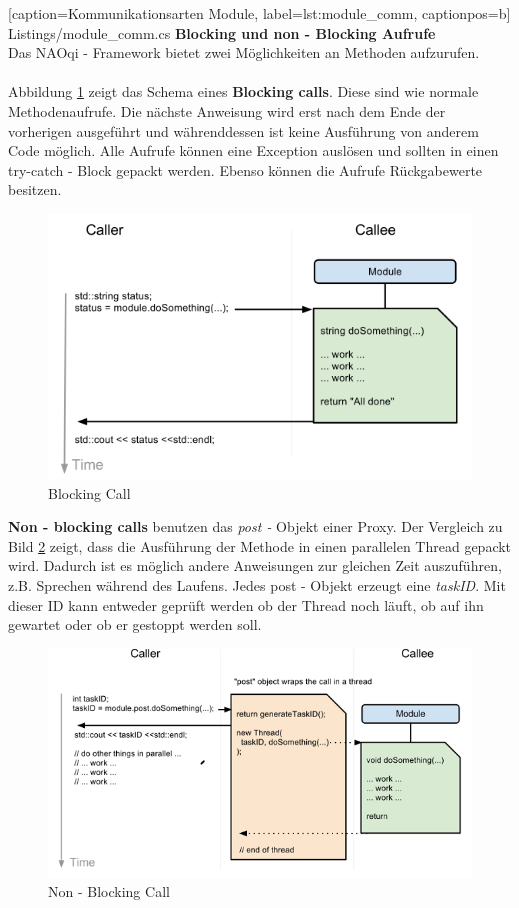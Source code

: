 
    [caption={Kommunikationsarten Module},
       label=lst:module_comm,
       captionpos=b]	
 {Listings/module_comm.cs}
\noindent	
\textbf{Blocking und non - Blocking Aufrufe}
\\
Das NAOqi - Framework bietet zwei Möglichkeiten an Methoden aufzurufen. 
\\
\\
Abbildung \ref{f:naoqi_blockingcall} zeigt das Schema eines \textbf{Blocking calls}. Diese sind wie normale Methodenaufrufe. Die nächste Anweisung wird erst nach dem Ende der vorherigen ausgeführt und währenddessen ist keine Ausführung von anderem Code möglich. Alle Aufrufe können eine Exception auslösen und sollten in einen try-catch - Block gepackt werden. Ebenso können die Aufrufe Rückgabewerte besitzen.
\begin{figure}[H]						
	\centering							
	\includegraphics[scale=0.8]{Bilder/blockingcall.PNG}
	\caption{Blocking Call}						
	\label{f:naoqi_blockingcall}						
\end{figure}
\textbf{Non - blocking calls} benutzen das \textit{post - }Objekt einer Proxy. Der Vergleich zu Bild \ref{f:naoqi_nonblockingcall} zeigt, dass die Ausführung der Methode in einen parallelen Thread gepackt wird. Dadurch ist es möglich andere Anweisungen zur gleichen Zeit auszuführen, z.B. Sprechen während des Laufens. Jedes post - Objekt erzeugt eine \textit{taskID}. Mit dieser ID kann entweder geprüft werden ob der Thread noch läuft, ob auf ihn gewartet oder ob er gestoppt werden soll. 
\begin{figure}[H]						
	\centering							
	\includegraphics[scale=0.8]{Bilder/nonblockingcall.PNG}
	\caption{Non - Blocking Call}						
	\label{f:naoqi_nonblockingcall}						
\end{figure}


